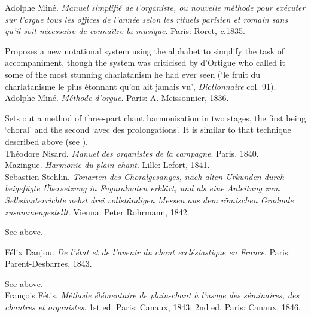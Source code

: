     \parindent=0pt
    \hangindent=0pt
  \covid{}Adolphe Miné. \emph{Manuel simplifié de l'organiste, ou nouvelle méthode pour exécuter sur l'orgue tous les offices de l'année selon les rituels parisien et romain sans qu'il soit nécessaire de connaître la musique}. Paris:  Roret, \emph{c}.1835.

     \parindent=20pt
     \hangindent=20pt
     Proposes a new notational system using the alphabet to simplify the task of accompaniment, though the system was criticised by d'Ortigue who called it some of the most stunning charlatanism he had ever seen (`le fruit du charlatanisme le plus étonnant qu'on ait jamais vu', \emph{Dictionnaire} col. 91).\\

    \parindent=0pt
    \hangindent=0pt
  Adolphe Miné. \emph{Méthode d'orgue}. Paris:  A. Meissonnier, 1836.

     \parindent=20pt
     \hangindent=20pt
     Sets out a method of three-part chant harmonisation in two stages, the first being `choral' and the second `avec des prolongations'. It is similar to that technique described above (see ).\\

    \parindent=0pt
    \hangindent=0pt
  \covid{}Théodore Nisard. \emph{Manuel des organistes de la campagne}. Paris, 1840. \\

    \parindent=0pt
    \hangindent=0pt
  \covid{}Mazingue. \emph{Harmonie du plain-chant}. Lille:  Lefort, 1841. \\

    \parindent=0pt
    \hangindent=0pt
  Sebastien Stehlin. \emph{Tonarten des Choralgesanges, nach alten Urkunden durch beigefügte Übersetzung in Fuguralnoten erklärt, und als eine Anleitung zum Selbstunterrichte nebst drei vollständigen Messen aus dem römischen Graduale zusammengestellt}. Vienna:  Peter Rohrmann, 1842.

     \parindent=20pt
     \hangindent=20pt
     See  above.\\\pagebreak{}

    \parindent=0pt
    \hangindent=0pt
  Félix Danjou. \emph{De l'état et de l'avenir du chant ecclésiastique en France}. Paris:  Parent-Desbarres, 1843.

     \parindent=20pt
     \hangindent=20pt
     See  above.\\

    \parindent=0pt
    \hangindent=0pt
  François Fétis. \emph{Méthode élémentaire de plain-chant à l'usage des séminaires, des chantres et organistes}. 1st ed. Paris:  Canaux, 1843;  2nd ed. Paris:  Canaux, 1846.

